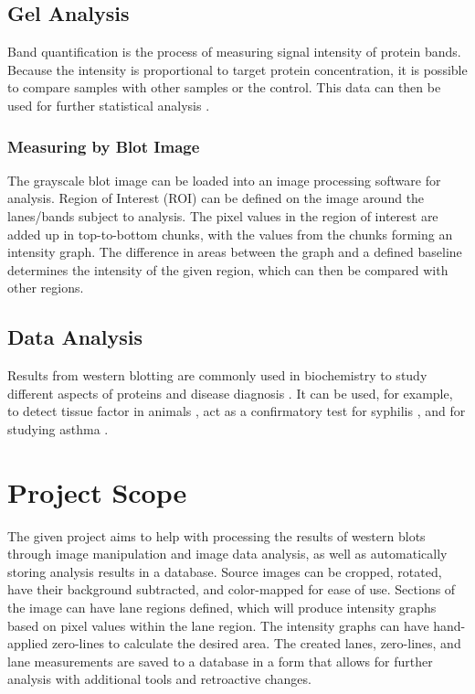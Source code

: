 \subsection{Gel Analysis}
Band quantification is the process of measuring signal intensity of protein bands. Because the intensity is proportional to target protein concentration, it is possible to compare samples with other samples or the control. This data can then be used for further statistical analysis \cite{western-blotting-basics}.

\subsubsection{Measuring by Blot Image}
The grayscale blot image can be loaded into an image processing software for analysis. Region of Interest (ROI) can be defined on the image around the lanes/bands subject to analysis. The pixel values in the region of interest are added up in top-to-bottom chunks, with the values from the chunks forming an intensity graph. The difference in areas between the graph and a defined baseline determines the intensity of the given region, which can then be compared with other regions.

\subsection{Data Analysis}

Results from western blotting are commonly used in biochemistry to study different aspects of proteins and disease diagnosis \cite{western-blotting-technique}. It can be used, for example, to detect tissue factor in animals \cite{western-blotting-tissue-factor}, act as a confirmatory test for syphilis \cite{western-blotting-confirmatory-syphilis}, and for studying asthma \cite{western-blotting-asthma-study}.

\section{Project Scope}
The given project aims to help with processing the results of western blots through image manipulation and image data analysis, as well as automatically storing analysis results in a database. Source images can be cropped, rotated, have their background subtracted, and color-mapped for ease of use. Sections of the image can have lane regions defined, which will produce intensity graphs based on pixel values within the lane region. The intensity graphs can have hand-applied zero-lines to calculate the desired area. The created lanes, zero-lines, and lane measurements are saved to a database in a form that allows for further analysis with additional tools and retroactive changes.
